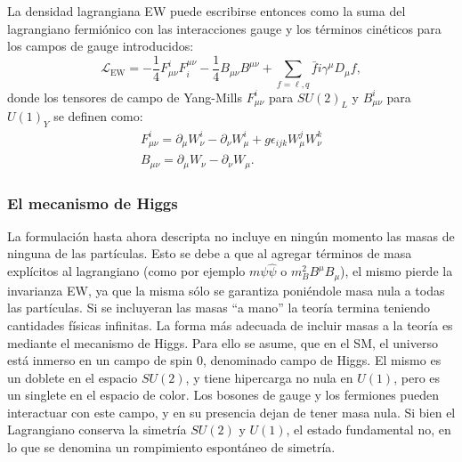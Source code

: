 La densidad lagrangiana \ac{EW} puede escribirse entonces como la suma del lagrangiano fermiónico con las interacciones gauge y los términos cinéticos para los campos de gauge introducidos:
\begin{equation}
    \mathcal{L}_{\text{EW}} = 
    - \frac{1}{4} F_{\mu\nu}^i F^{\mu\nu}_i
    - \frac{1}{4} B_{\mu\nu} B^{\mu\nu}
    + \sum_{f = \ell, q} \bar{f} i \gamma^{\mu} D_{\mu} f,
\end{equation}
donde los tensores de campo de Yang-Mills \(F_{\mu\nu}^i\) para \(SU(2)_L\) y \(B_{\mu\nu}^i\) para \(U(1)_Y\) se definen como:
\begin{gather}
    F_{\mu\nu}^i = \partial_{\mu} W_{\nu}^i  -  \partial_{\nu} W_{\mu}^i + g \epsilon_{ijk} W_{\mu}^jW_{\nu}^k \\
    B_{\mu\nu} = \partial_{\mu} W_{\nu}  -  \partial_{\nu} W_{\mu}.
\end{gather}




\subsubsection{El mecanismo de Higgs}

La formulaci\'on hasta ahora descripta no incluye en ning\'un momento las masas de ninguna de las part\'iculas. Esto se debe a que al agregar t\'erminos de masa expl\'icitos al lagrangiano (como por ejemplo \(m \psi \hat{\psi}\) o \(m_B^2 B^{\mu}B_{\mu}\)), el mismo pierde la invarianza \ac{EW}, ya que la misma s\'olo se garantiza poni\'endole masa nula a todas las part\'iculas. Si se incluyeran las masas \enquote{a mano} la teor\'ia termina teniendo cantidades f\'isicas infinitas. La forma m\'as adecuada de incluir masas a la teor\'ia es mediante el mecanismo de Higgs. Para ello se asume, que en el \ac{SM}, el universo est\'a inmerso en un campo de spin 0, denominado campo de Higgs. El mismo es un doblete en el espacio \(SU(2)\), y tiene hipercarga no nula en \(U(1)\), pero es un singlete en el espacio de color. Los bosones de gauge y los fermiones pueden interactuar con este campo, y en su presencia dejan de tener masa nula. Si bien el Lagrangiano conserva la simetr\'ia \(SU(2)\) y \(U(1)\), el estado fundamental no, en lo que se denomina un rompimiento espont\'aneo de simetr\'ia.

